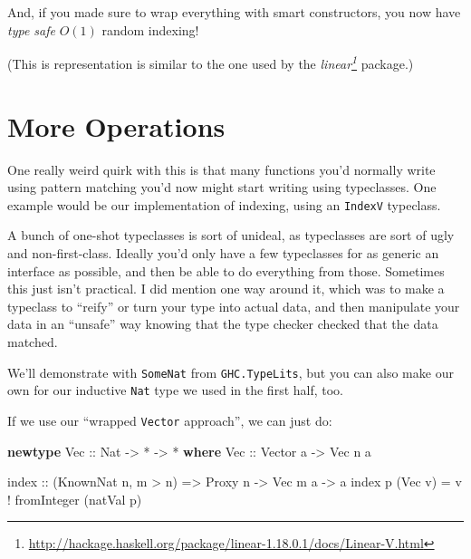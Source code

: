 \documentclass[]{article}
\newenvironment{Shaded}{}{}
\newcommand{\KeywordTok}[1]{\textcolor[rgb]{0.00,0.44,0.13}{\textbf{{#1}}}}
\newcommand{\DataTypeTok}[1]{\textcolor[rgb]{0.56,0.13,0.00}{{#1}}}
\newcommand{\OtherTok}[1]{\textcolor[rgb]{0.00,0.44,0.13}{{#1}}}
\newcommand{\FunctionTok}[1]{\textcolor[rgb]{0.02,0.16,0.49}{{#1}}}
\newcommand{\NormalTok}[1]{{#1}}
\renewcommand{\href}[2]{#2\footnote{\url{#1}}}
\begin{document}
And, if you made sure to wrap everything with smart constructors, you now have
\emph{type safe} \(O(1)\) random indexing!

(This is representation is similar to the one used by the
\emph{\href{http://hackage.haskell.org/package/linear-1.18.0.1/docs/Linear-V.html}{linear}}
package.)

\section{More Operations}\label{more-operations}

One really weird quirk with this is that many functions you'd normally write
using pattern matching you'd now might start writing using typeclasses. One
example would be our implementation of indexing, using an \texttt{IndexV}
typeclass.

A bunch of one-shot typeclasses is sort of unideal, as typeclasses are sort of
ugly and non-first-class. Ideally you'd only have a few typeclasses for as
generic an interface as possible, and then be able to do everything from those.
Sometimes this just isn't practical. I did mention one way around it, which was
to make a typeclass to ``reify'' or turn your type into actual data, and then
manipulate your data in an ``unsafe'' way knowing that the type checker checked
that the data matched.

We'll demonstrate with \texttt{SomeNat} from \texttt{GHC.TypeLits}, but you can
also make our own for our inductive \texttt{Nat} type we used in the first half,
too.

If we use our ``wrapped \texttt{Vector} approach'', we can just do:

\begin{Shaded}
\begin{Highlighting}[]
\KeywordTok{newtype} \DataTypeTok{Vec}\OtherTok{ ::} \DataTypeTok{Nat} \OtherTok{->} \FunctionTok{*} \OtherTok{->} \FunctionTok{*} \KeywordTok{where}
    \DataTypeTok{Vec}\OtherTok{ ::} \DataTypeTok{Vector} \NormalTok{a }\OtherTok{->} \DataTypeTok{Vec} \NormalTok{n a}

\NormalTok{index}\OtherTok{ ::} \NormalTok{(}\DataTypeTok{KnownNat} \NormalTok{n, m }\FunctionTok{>} \NormalTok{n) }\OtherTok{=>} \DataTypeTok{Proxy} \NormalTok{n }\OtherTok{->} \DataTypeTok{Vec} \NormalTok{m a }\OtherTok{->} \NormalTok{a}
\NormalTok{index p (}\DataTypeTok{Vec} \NormalTok{v) }\FunctionTok{=} \NormalTok{v }\FunctionTok{!} \NormalTok{fromInteger (natVal p)}
\end{Highlighting}
\end{Shaded}
\end{document}
